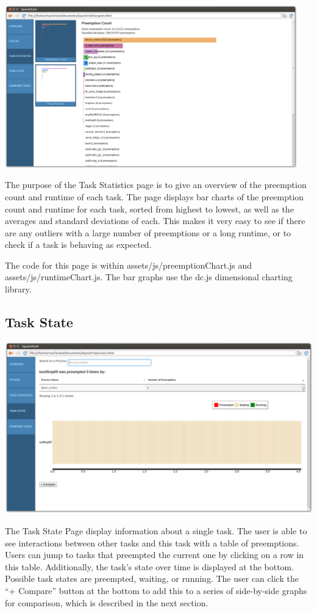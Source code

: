 \documentclass{hmcclinic}
\begin{document}
  \includegraphics[width=5in]{task-statistics-page.png}

The purpose of the Task Statistics page is to give an overview of the preemption count and runtime of each task. The page displays bar charts of the preemption count and runtime for each task, sorted from highest to lowest, as well as the averages and standard deviations of each. This makes it very easy to see if there are any outliers with a large number of preemptions or a long runtime, or to check if a task is behaving as expected.

The code for this page is within assets/js/preemptionChart.js and assets/js/runtimeChart.js. The bar graphs use the dc.js dimensional charting library.

  \subsection{Task State}

  \includegraphics[scale=0.25]{task-state-page.png}
  
    The Task State Page display information about a single task. The user is
    able to see interactions between other tasks and this task with a table of
    preemptions. Users can jump to tasks that preempted the current one by
    clicking on a row in this table. Additionally, the task's state over time
    is displayed at the bottom. Possible task states are preempted, waiting, or
    running. The user can click the ``+ Compare'' button at the
    bottom to add this to a series of side-by-side graphs for comparison, which
    is described in the next section.
\end{document}
